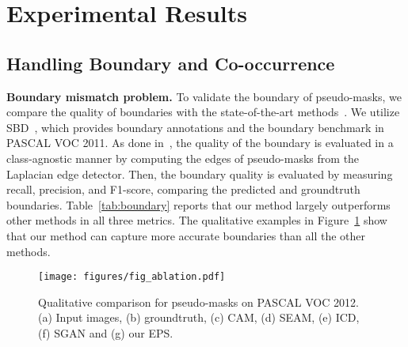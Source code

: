 \documentclass[final]{cvpr}
\begin{document}
\section{Experimental Results}

\subsection{Handling Boundary and Co-occurrence}\label{section:5.1}

\noindent\textbf{Boundary mismatch problem.} To validate the boundary of pseudo-masks, we compare the quality of boundaries with the state-of-the-art methods~\cite{chen2020boundary, wang2020self, zhou2016learning}. We utilize SBD~\cite{hariharan2011semantic}, which provides boundary annotations and the boundary benchmark in PASCAL VOC 2011. As done in~\cite{chen2020boundary}, the quality of the boundary is evaluated in a class-agnostic manner by computing the edges of pseudo-masks from the Laplacian edge detector. Then, the boundary quality is evaluated by measuring recall, precision, and F1-score, comparing the predicted and groundtruth boundaries. Table~\ref{tab:boundary} reports that our method largely outperforms other methods in all three metrics. The qualitative examples in Figure~\ref{fig:ablation} show that our method can capture more accurate boundaries than all the other methods.

\begin{figure}[t]
\centering
\texttt{[image: figures/fig\_ablation.pdf]}
\caption{Qualitative comparison for pseudo-masks on PASCAL VOC 2012. (a) Input images, (b) groundtruth, (c) CAM, (d) SEAM, (e) ICD, (f) SGAN and (g) our EPS.}
\label{fig:ablation} \vspace{-3mm}
\end{figure}
\end{document}
